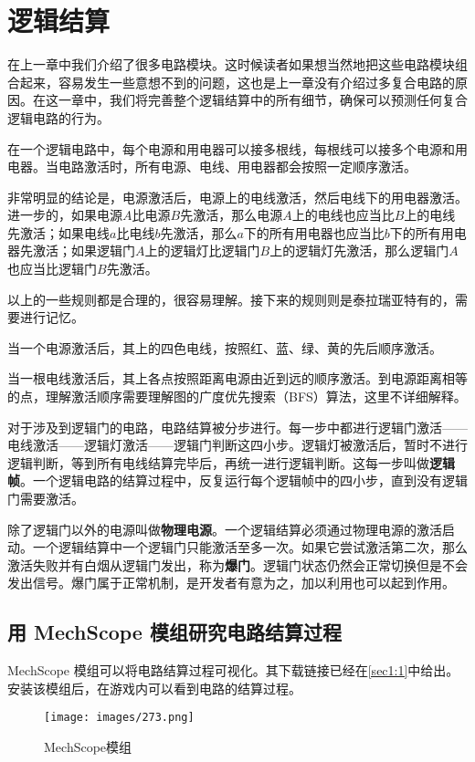 \chapter{逻辑结算}\label{sec7}

在上一章中我们介绍了很多电路模块。这时候读者如果想当然地把这些电路模块组合起来，容易发生一些意想不到的问题，这也是上一章没有介绍过多复合电路的原因。在这一章中，我们将完善整个逻辑结算中的所有细节，确保可以预测任何复合逻辑电路的行为。

在一个逻辑电路中，每个电源和用电器可以接多根线，每根线可以接多个电源和用电器。当电路激活时，所有电源、电线、用电器都会按照一定顺序激活。

非常明显的结论是，电源激活后，电源上的电线激活，然后电线下的用电器激活。进一步的，如果电源$A$比电源$B$先激活，那么电源$A$上的电线也应当比$B$上的电线先激活；如果电线$a$比电线$b$先激活，那么$a$下的所有用电器也应当比$b$下的所有用电器先激活；如果逻辑门$A$上的逻辑灯比逻辑门$B$上的逻辑灯先激活，那么逻辑门$A$也应当比逻辑门$B$先激活。

以上的一些规则都是合理的，很容易理解。接下来的规则则是泰拉瑞亚特有的，需要进行记忆。

当一个电源激活后，其上的四色电线，按照红、蓝、绿、黄的先后顺序激活。

当一根电线激活后，其上各点按照距离电源由近到远的顺序激活。到电源距离相等的点，理解激活顺序需要理解图的广度优先搜索（BFS）算法，这里不详细解释。

对于涉及到逻辑门的电路，电路结算被分步进行。每一步中都进行逻辑门激活——电线激活——逻辑灯激活——逻辑门判断这四小步。逻辑灯被激活后，暂时不进行逻辑判断，等到所有电线结算完毕后，再统一进行逻辑判断。这每一步叫做\textbf{逻辑帧}。一个逻辑电路的结算过程中，反复运行每个逻辑帧中的四小步，直到没有逻辑门需要激活。

除了逻辑门以外的电源叫做\textbf{物理电源}。一个逻辑结算必须通过物理电源的激活启动。一个逻辑结算中一个逻辑门只能激活至多一次。如果它尝试激活第二次，那么激活失败并有白烟从逻辑门发出，称为\textbf{爆门}。逻辑门状态仍然会正常切换但是不会发出信号。爆门属于正常机制，是开发者有意为之，加以利用也可以起到作用。

\section{用 MechScope 模组研究电路结算过程}
MechScope 模组可以将电路结算过程可视化。其下载链接已经在\autoref{sec1:1}中给出。安装该模组后，在游戏内可以看到电路的结算过程。

\begin{figure}[!ht]
\texttt{[image: images/273.png]}
\caption{MechScope模组}\label{i273}
\end{figure}

